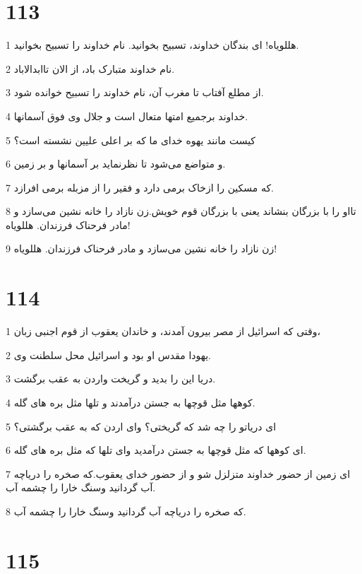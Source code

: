\chapter{113}

\par 1 هللویاه! ای بندگان خداوند، تسبیح بخوانید. نام خداوند را تسبیح بخوانید.
\par 2 نام خداوند متبارک باد، از الان تاابدالاباد.
\par 3 از مطلع آفتاب تا مغرب آن، نام خداوند را تسبیح خوانده شود.
\par 4 خداوند برجمیع امتها متعال است و جلال وی فوق آسمانها.
\par 5 کیست مانند یهوه خدای ما که بر اعلی علیین نشسته است؟
\par 6 و متواضع می‌شود تا نظرنماید بر آسمانها و بر زمین.
\par 7 که مسکین را ازخاک برمی دارد و فقیر را از مزبله برمی افرازد.
\par 8 تااو را با بزرگان بنشاند یعنی با بزرگان قوم خویش.زن نازاد را خانه نشین می‌سازد و مادر فرحناک فرزندان. هللویاه!
\par 9 زن نازاد را خانه نشین می‌سازد و مادر فرحناک فرزندان. هللویاه!
 
\chapter{114}

\par 1 وقتی که اسرائیل از مصر بیرون آمدند، و خاندان یعقوب از قوم اجنبی زبان، 
\par 2 یهودا مقدس او بود و اسرائیل محل سلطنت وی.
\par 3 دریا این را بدید و گریخت واردن به عقب برگشت.
\par 4 کوهها مثل قوچها به جستن درآمدند و تلها مثل بره های گله.
\par 5 ‌ای دریاتو را چه شد که گریختی؟ و‌ای اردن که به عقب برگشتی؟
\par 6 ‌ای کوهها که مثل قوچها به جستن درآمدید و‌ای تلها که مثل بره های گله.
\par 7 ‌ای زمین از حضور خداوند متزلزل شو و از حضور خدای یعقوب.که صخره را دریاچه آب گردانید وسنگ خارا را چشمه آب.
\par 8 که صخره را دریاچه آب گردانید وسنگ خارا را چشمه آب.
 
\chapter{115}

